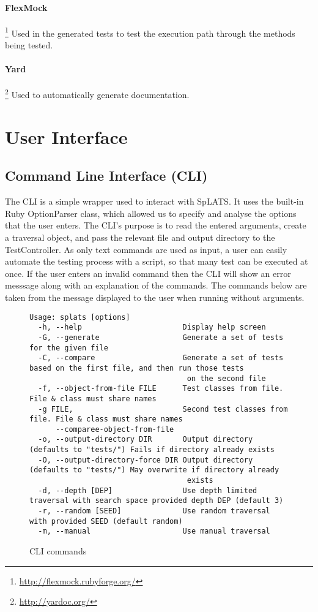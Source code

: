   \paragraph{FlexMock}\footnote{\url{http://flexmock.rubyforge.org/}} Used in the generated tests to test the execution path through the methods being tested.
  \paragraph{Yard}\footnote{\url{http://yardoc.org/}} Used to automatically generate documentation.
  
  \section{User Interface}
  \subsection{Command Line Interface (CLI)}
  
  The CLI is a simple wrapper used to interact with SpLATS. 
  It uses the built-in Ruby OptionParser class, which allowed us to specify and analyse the options that the user enters. 
  The CLI's purpose is to read the entered arguments, create a traversal object, and pass the relevant file and output directory to the TestController.
  As only text commands are used as input, a user can easily automate the testing process with a script, so that many test can be executed at once.
  If the user enters an invalid command then the CLI will show an error messsage along with an explanation of the commands.
  The commands below are taken from the message displayed to the user when running without arguments.
  \begin{figure}
  \scriptsize
  \begin{verbatim}
Usage: splats [options]
  -h, --help                       Display help screen
  -G, --generate                   Generate a set of tests for the given file
  -C, --compare                    Generate a set of tests based on the first file, and then run those tests
                                    on the second file
  -f, --object-from-file FILE      Test classes from file. File & class must share names
  -g FILE,                         Second test classes from file. File & class must share names
      --comparee-object-from-file
  -o, --output-directory DIR       Output directory (defaults to "tests/") Fails if directory already exists
  -O, --output-directory-force DIR Output directory (defaults to "tests/") May overwrite if directory already
                                    exists
  -d, --depth [DEP]                Use depth limited traversal with search space provided depth DEP (default 3)
  -r, --random [SEED]              Use random traversal with provided SEED (default random)
  -m, --manual                     Use manual traversal
  \end{verbatim}
  \caption{CLI commands}
  \end{figure}
